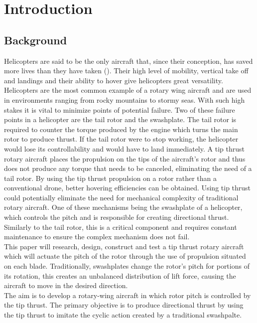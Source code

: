 \chapter{Introduction}
    \label{sec: Introduction}
    \section{Background}
        Helicopters are said to be the only aircraft that, since their conception, has saved more lives than they have taken (\cite{anderson2010helicopters}). Their  high level of mobility, vertical take off and landings and their ability to hover give helicopters great versatility. Helicopters are the most common example of a rotary wing aircraft and are used in environments ranging from rocky mountains to stormy seas. With such high stakes it is vital to minimize points of potential failure. Two of these failure points in a helicopter are the tail rotor and the swashplate. The tail rotor is required to counter the torque produced by the engine which turns the main rotor to produce thrust. If the tail rotor were to stop working, the helicopter would lose its controllability and would have to land immediately. A tip thrust rotary aircraft places the propulsion on the tips of the aircraft's rotor and thus does not produce any torque that needs to be canceled, eliminating the need of a tail rotor. By using the tip thrust propulsion on  a rotor rather than a conventional drone, better hovering efficiencies can be obtained. Using tip thrust could potentially eliminate the need for mechanical complexity of traditional rotary aircraft. One of these mechanisms being the swashplate of a helicopter, which controls the pitch and is responsible for creating directional thrust. Similarly to the tail rotor, this is a critical component and requires constant maintenance to ensure the complex mechanism does not fail. \\
        This paper will research, design, construct and test a tip thrust rotary aircraft which will actuate the pitch of the rotor through the use of propulsion situated on each blade. Traditionally, swashplates  change the rotor's pitch for portions of its rotation, this creates an unbalanced distribution of lift force, causing the aircraft to move in the desired direction. \\
        The aim is to develop a rotary-wing aircraft in which rotor pitch is controlled by the tip thrust. The primary objective is to produce directional thrust by using the tip thrust to imitate the cyclic action created by a traditional swashpalte. 


